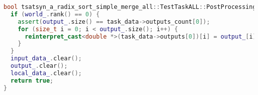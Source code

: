 \documentclass[a4paper,12pt]{article}
\begin{document}
\begin{lstlisting}[language=C++,
    breaklines=true,       % Автоматический перенос строк
    basicstyle=\small\ttfamily, % Уменьшенный шрифт
    columns=fullflexible ]
bool tsatsyn_a_radix_sort_simple_merge_all::TestTaskALL::PostProcessingImpl() {
  if (world_.rank() == 0) {
    assert(output_.size() == task_data->outputs_count[0]);
    for (size_t i = 0; i < output_.size(); i++) {
      reinterpret_cast<double *>(task_data->outputs[0])[i] = output_[i];
    }
  }
  input_data_.clear();
  output_.clear();
  local_data_.clear();
  return true;
}
\end{lstlisting}
\end{document}
